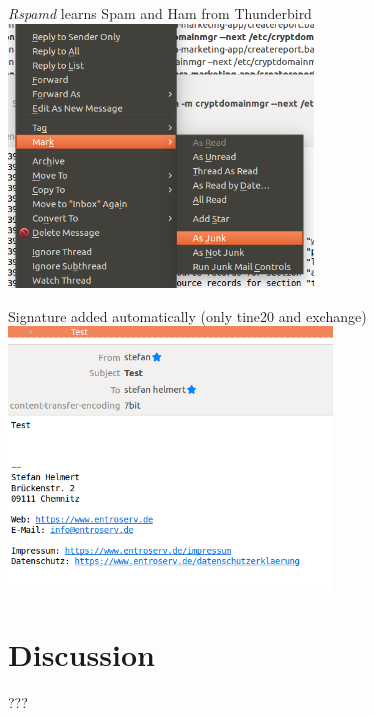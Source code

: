 \documentclass{beamer}
\begin{document}
\begin{frame}[fragile]{\insertsection}{\insertsubsection}
	\emph{Rspamd} learns Spam and Ham from Thunderbird
	\includegraphics[height=7cm]{TBlearn.png}\\
\end{frame}	

\begin{frame}[fragile]{\insertsection}{\insertsubsection}
	Signature added automatically (only tine20 and exchange)
	\includegraphics[height=7cm]{signature.png}\\
\end{frame}

\section{Discussion}
\begin{frame}[fragile]{\insertsection}{\insertsubsection} %
  \Huge{???}	
\end{frame}	
\end{document}

